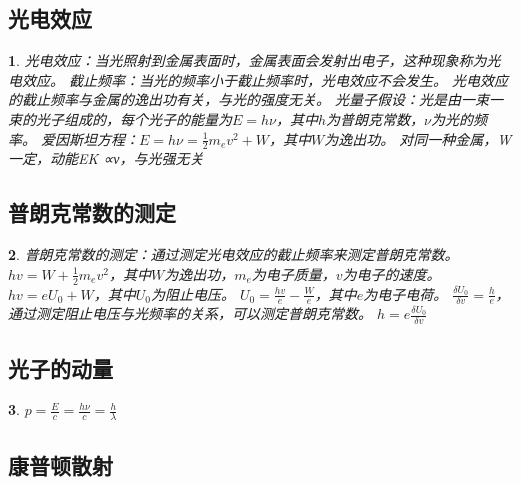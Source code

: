 \documentclass[UTF8]{report}
\theoremstyle{MyLineTheoremStyle} %
\theoremstyle{MyBlockTheoremStyle} %
\theoremstyle{MySubsubsectionStyle} %
\newtheorem{definition}{}
\begin{document}
\subsection{光电效应}

\begin{definition}
    光电效应：当光照射到金属表面时，金属表面会发射出电子，这种现象称为光电效应。
    截止频率：当光的频率小于截止频率时，光电效应不会发生。
    光电效应的截止频率与金属的逸出功有关，与光的强度无关。
    光量子假设：光是由一束一束的光子组成的，每个光子的能量为$E=h\nu$，其中$h$为普朗克常数，$\nu$为光的频率。
    爱因斯坦方程：$E=h\nu=\frac{1}{2}m_ev^2+W$，其中$W$为逸出功。
    对同⼀种⾦属，W⼀定，动能EK ∝ν，与光强⽆关
\end{definition}

\subsection{普朗克常数的测定}

\begin{definition}
    普朗克常数的测定：通过测定光电效应的截止频率来测定普朗克常数。
  $hv = W + \frac{1}{2}m_ev^2$，其中$W$为逸出功，$m_e$为电子质量，$v$为电子的速度。
  $hv = eU_0 + W$，其中$U_0$为阻止电压。
  $U_0 = \frac{hv}{e} - \frac{W}{e}$，其中$e$为电子电荷。
  $\frac{\delta U_0}{\delta v} = \frac{h}{e}$，通过测定阻止电压与光频率的关系，可以测定普朗克常数。
  $h = e\frac{\delta U_0}{\delta v}$
\end{definition}    


\subsection{光子的动量}

\begin{definition}
$p = \frac{E}{c} = \frac{h\nu}{c} = \frac{h}{\lambda}$
\end{definition}


\subsection{康普顿散射}
\end{document}
